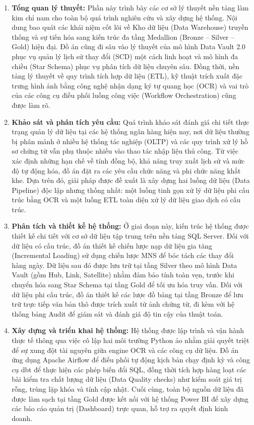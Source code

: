 \documentclass[oneside, a4paper]{book}
\theoremstyle{plain}
\theoremstyle{definition}
\theoremstyle{remark}
\begin{document}
\begin{enumerate}
    \item \textbf{Tổng quan lý thuyết:} 
    Phần này trình bày các cơ sở lý thuyết nền tảng làm kim chỉ nam cho toàn bộ quá trình nghiên cứu và xây dựng hệ thống. Nội dung bao quát các khái niệm cốt lõi về Kho dữ liệu (Data Warehouse) truyền thống và sự tiến hóa sang kiến trúc đa tầng Medallion (Bronze -- Silver -- Gold) hiện đại. Đồ án cũng đi sâu vào lý thuyết của mô hình Data Vault 2.0 phục vụ quản lý lịch sử thay đổi (SCD) một cách linh hoạt và mô hình đa chiều (Star Schema) phục vụ phân tích dữ liệu chuyên sâu. Đồng thời, nền tảng lý thuyết về quy trình tích hợp dữ liệu (ETL), kỹ thuật trích xuất đặc trưng hình ảnh bằng công nghệ nhận dạng ký tự quang học (OCR) và vai trò của các công cụ điều phối luồng công việc (Workflow Orchestration) cũng được làm rõ.

    \item \textbf{Khảo sát và phân tích yêu cầu:} 
    Quá trình khảo sát đánh giá chi tiết thực trạng quản lý dữ liệu tại các hệ thống ngân hàng hiện nay, nơi dữ liệu thường bị phân mảnh ở nhiều hệ thống tác nghiệp (OLTP) và các quy trình xử lý hồ sơ chứng từ vẫn phụ thuộc nhiều vào thao tác nhập liệu thủ công. Từ việc xác định những hạn chế về tính đồng bộ, khả năng truy xuất lịch sử và mức độ tự động hóa, đồ án đặt ra các yêu cầu chức năng và phi chức năng khắt khe. Dựa trên đó, giải pháp được đề xuất là xây dựng hai luồng dữ liệu (Data Pipeline) độc lập nhưng thống nhất: một luồng tinh gọn xử lý dữ liệu phi cấu trúc bằng OCR và một luồng ETL toàn diện xử lý dữ liệu giao dịch có cấu trúc.

    \item \textbf{Phân tích và thiết kế hệ thống:} 
    Ở giai đoạn này, kiến trúc hệ thống được thiết kế chi tiết với cơ sở dữ liệu tập trung trên nền tảng SQL Server. Đối với dữ liệu có cấu trúc, đồ án thiết kế chiến lược nạp dữ liệu gia tăng (Incremental Loading) sử dụng chiến lược MNS để bóc tách các thay đổi hàng ngày. Dữ liệu sau đó được lưu trữ tại tầng Silver theo mô hình Data Vault (gồm Hub, Link, Satellite) nhằm đảm bảo tính toàn vẹn, trước khi chuyển hóa sang Star Schema tại tầng Gold để tối ưu hóa truy vấn. Đối với dữ liệu phi cấu trúc, đồ án thiết kế các lược đồ bảng tại tầng Bronze để lưu trữ trực tiếp văn bản thô được trích xuất từ ảnh chứng từ, đi kèm với hệ thống bảng Audit để giám sát và đánh giá độ tin cậy của thuật toán.

    \item \textbf{Xây dựng và triển khai hệ thống:} 
    Hệ thống được lập trình và vận hành thực tế thông qua việc cô lập hai môi trường Python ảo nhằm giải quyết triệt để sự xung đột tài nguyên giữa engine OCR và các công cụ dữ liệu. Đồ án ứng dụng Apache Airflow để điều phối tự động kịch bản chạy định kỳ và công cụ dbt để thực hiện các phép biến đổi SQL, đồng thời tích hợp hàng loạt các bài kiểm tra chất lượng dữ liệu (Data Quality checks) như kiểm soát giá trị rỗng, trùng lặp khóa và tính cập nhật. Cuối cùng, toàn bộ nguồn dữ liệu đã được làm sạch tại tầng Gold được kết nối với hệ thống Power BI để xây dựng các báo cáo quản trị (Dashboard) trực quan, hỗ trợ ra quyết định kinh doanh.
\end{enumerate}
\end{document}
